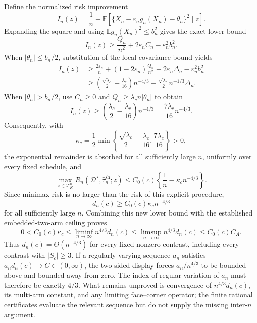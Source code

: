 Define the normalized risk improvement
\[
 I_n(z)=\frac1n-
 \mathbb E\left[\{X_n-\varepsilon_ng_n(X_n)-\theta_n\}^2\mid z\right].
\]
Expanding the square and using \(\mathbb E g_n(X_n)^2\leq b_n^2\) gives the exact lower bound
\[
 I_n(z)\geq\frac{Q_n}{n^2}+2\varepsilon_nC_n-\varepsilon_n^2b_n^2.
\]
When \(|\theta_n|\leq b_n/2\), substitution of the local covariance bound yields
\[
 \begin{aligned}
 I_n(z)
 &\geq\frac{2\varepsilon_n}{n}
 +(1-2\varepsilon_n)\frac{Q_n}{n^2}
 -2\varepsilon_n\Delta_n-\varepsilon_n^2b_n^2\\
 &\geq
 \left(\frac{\sqrt{\lambda_c}}2-\frac{\lambda_c}{16}\right)n^{-4/3}
 -\frac{\sqrt{\lambda_c}}2n^{-1/3}\Delta_n.
 \end{aligned}
\]
When \(|\theta_n|>b_n/2\), use \(C_n\geq0\) and \(Q_n\geq\lambda_cn|\theta_n|\) to obtain
\[
 I_n(z)\geq
 \left(\frac{\lambda_c}{2}-\frac{\lambda_c}{16}\right)n^{-4/3}
 =\frac{7\lambda_c}{16}n^{-4/3}.
\]
Consequently, with
\[
 \kappa_c=\frac12\min\left\{
 \frac{\sqrt{\lambda_c}}2-\frac{\lambda_c}{16},
 \frac{7\lambda_c}{16}
 \right\}>0,
\]
the exponential remainder is absorbed for all sufficiently large \(n\), uniformly over every fixed schedule, and
\[
 \max_{z\in\mathcal T_K^n}
 R_n(\mathcal D^\star,\widehat\tau_n^{\mathrm{sh}};z)
 \leq C_0(c)\left\{\frac1n-\kappa_cn^{-4/3}\right\}.
\]
Since minimax risk is no larger than the risk of this explicit procedure,
\[
 d_n(c)\geq C_0(c)\kappa_cn^{-4/3}
\]
for all sufficiently large \(n\).  Combining this new lower bound with the established embedded-two-arm ceiling proves
\[
 0<C_0(c)\kappa_c
 \leq\liminf_{n\to\infty}n^{4/3}d_n(c)
 \leq\limsup_{n\to\infty}n^{4/3}d_n(c)
 \leq C_0(c)C_A.
\]
Thus \(d_n(c)=\Theta(n^{-4/3})\) for every fixed nonzero contrast, including every contrast with \(|S_c|\geq3\).  If a regularly varying sequence \(a_n\) satisfies \(a_nd_n(c)\to C\in(0,\infty)\), the two-sided display forces \(a_n/n^{4/3}\) to be bounded above and bounded away from zero.  The index of regular variation of \(a_n\) must therefore be exactly \(4/3\).  What remains unproved is convergence of \(n^{4/3}d_n(c)\), its multi-arm constant, and any limiting face--corner operator; the finite rational certificates evaluate the relevant sequence but do not supply the missing inter-\(n\) argument.